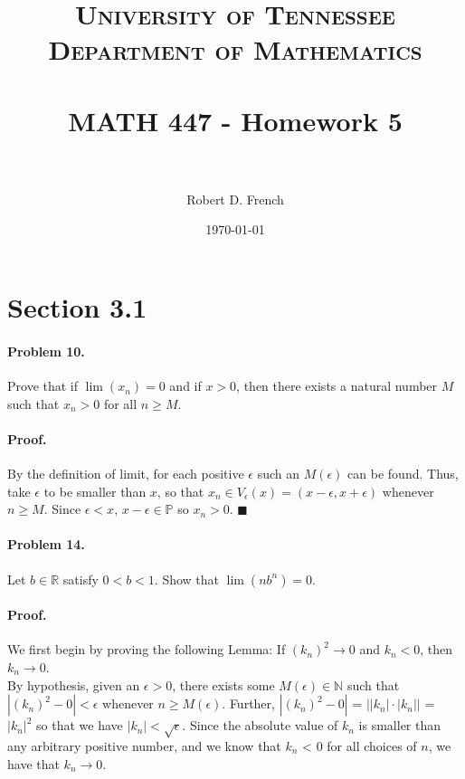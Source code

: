 \documentclass[paper=a4, fontsize=11pt]{scrartcl} %
\title{	
\normalfont \normalsize 
\textsc{University of Tennessee \\ Department of Mathematics} \\ [25pt] %
\horrule{0.5pt} \\[0.4cm] %
\huge MATH 447 - Homework 5 \\ %
\horrule{2pt} \\[0.5cm] %
}
\author{Robert D. French} %
\date{\normalsize\today} %
\numberwithin{equation}{section} %
\numberwithin{figure}{section} %
\numberwithin{table}{section} %
\begin{document}
\maketitle %


\section*{Section 3.1}

\paragraph{Problem 10.} Prove that if $\lim(x_n) = 0$ and if $x > 0$, then there exists a natural number $M$ such that $x_n > 0$ for all $n \geq M$.

\paragraph{Proof.} By the definition of limit, for each positive $\epsilon$ such an $M(\epsilon)$ can be found. Thus, take $\epsilon$ to be smaller than $x$, so that $x_n \in V_\epsilon (x) = (x - \epsilon, x + \epsilon)$ whenever $n \geq M$. Since $\epsilon < x$, $x - \epsilon \in \mathbb{P}$ so $x_n > 0$. $\blacksquare$

\paragraph{Problem 14.} Let $b \in \mathbb{R}$ satisfy $0 < b < 1$. Show that $\lim(nb^n) = 0$.

\paragraph{Proof.} We first begin by proving the following Lemma: If $(k_n)^2 \rightarrow 0$ and $k_n < 0$, then $k_n \rightarrow 0$.\\

By hypothesis, given an $\epsilon > 0$, there exists some $M(\epsilon) \in \mathbb{N}$ such that  $|(k_n)^2 - 0| < \epsilon$ whenever $n \geq M(\epsilon)$. Further, $|(k_n)^2 - 0|$ = $\left| \left| k_n \right| \cdot \left| k_n \right| \right|$ = $|k_n|^2$ so that we have $|k_n| < \sqrt{\epsilon}$. Since the absolute value of $k_n$ is smaller than any arbitrary positive number, and we know that $k_n$ < 0 for all choices of $n$, we have that $k_n \rightarrow 0$.\\
\end{document}
